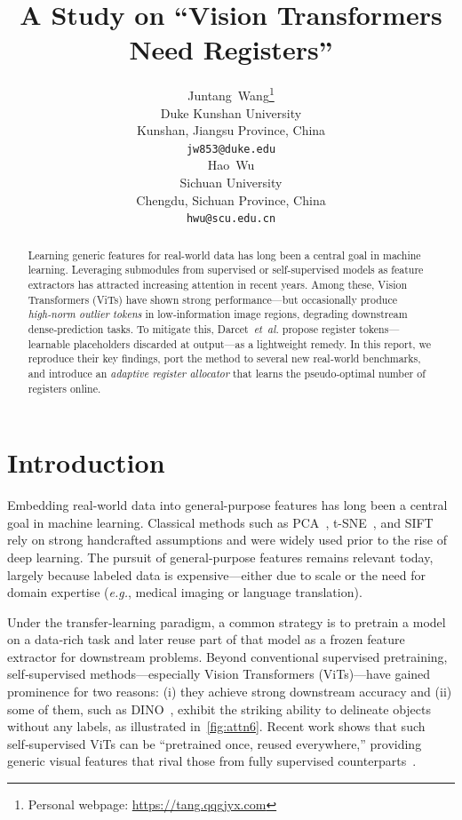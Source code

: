 \documentclass{article}
\title{A Study on ``Vision Transformers Need Registers''}
\author{%
  Juntang~Wang\thanks{Personal webpage: \url{https://tang.qqgjyx.com}} \\
  Duke Kunshan University\\
  Kunshan, Jiangsu Province, China \\
  \texttt{jw853@duke.edu} \\
  \And
  Hao~Wu \\
  Sichuan University \\
  Chengdu, Sichuan Province, China \\
  \texttt{hwu@scu.edu.cn}
}
\newcommand{\citep}{\parencite}
\begin{document}
\maketitle



\begin{abstract}
    Learning generic features for real-world data has long been a central goal in machine learning.
    Leveraging submodules from supervised or self-supervised models as feature extractors has attracted increasing attention in recent years.
    Among these, Vision Transformers (ViTs) have shown strong performance—but occasionally produce \emph{high‑norm outlier tokens} in low‑information image regions, degrading downstream dense‑prediction tasks.
    To mitigate this, Darcet~\emph{et~al.} propose register tokens—learnable placeholders discarded at output—as a lightweight remedy. 
    In this report, we reproduce their key findings, port the method to several new real‑world benchmarks, and introduce an \emph{adaptive register allocator} that learns the pseudo‑optimal number of registers online.
\end{abstract}



\section{Introduction}
\label{sec:intro}
Embedding real-world data into general-purpose features has long been a central goal in machine learning.
Classical methods such as PCA~\citep{jolliffePrincipalComponentAnalysis1986}, t-SNE~\citep{van2008visualizing}, and SIFT~\citep{loweDistinctiveImageFeatures2004} rely on strong handcrafted assumptions and were widely used prior to the rise of deep learning. 
The pursuit of general-purpose features remains relevant today, largely because labeled data is expensive—either due to scale or the need for domain expertise (\emph{e.g.}, medical imaging or language translation).

Under the transfer‑learning paradigm, a common strategy is to pretrain a model on a data‑rich task and later reuse part of that model as a frozen feature extractor for downstream problems.
Beyond conventional supervised pretraining, self‑supervised methods—especially Vision Transformers (ViTs)—have gained prominence for two reasons: (i) they achieve strong downstream accuracy and (ii) some of them, such as DINO~\citep{caronEmergingPropertiesSelfsupervised2021}, exhibit the striking ability to delineate objects without any labels, as illustrated in~\cref{fig:attn6}.
Recent work shows that such self‑supervised ViTs can be “pretrained once, reused everywhere,” providing generic visual features that rival those from fully supervised counterparts~\citep{caronEmergingPropertiesSelfsupervised2021, oquabDINOv2LearningRobust2024}.
\end{document}
